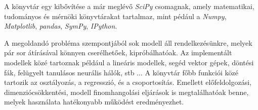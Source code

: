 A könyvtár egy kibővítése a már meglévő \textit{SciPy} csomagnak, amely matematikai, tudományos és mérnöki könyvtárakat tartalmaz, mint pédául a \textit{Numpy}, \textit{Matplotlib}, \textit{pandas}, \textit{SymPy}, \textit{IPython}.

A megoldandó probléma szempontjából sok modell áll rendelkezésünkre, melyek pár sor átírásával könnyen cserélhetőek, kipróbálhatóak. Az implementált modellek közé tartoznak például a lineáris modellek, segéd vektor gépek, döntési fák, felügyelt tanulásos neurális hálók, stb $\ldots$ A könyvtár főbb funkciói közé tartozik az osztályozás, a regresszió, és a csoportosítás. Emellett előfeldolgozási, dimenziócsökkentési, modell finomhangolási eljárások is megtalálhatóak benne, melyek használata hatékonyabb működést eredményezhet. \cite{pedregosa2011scikit} \cite{hackeling2017mastering}
